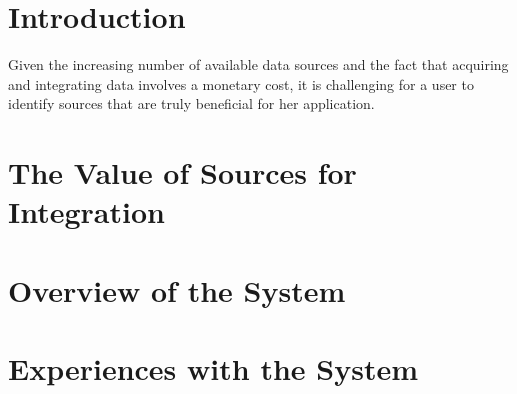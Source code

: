 \documentclass{vldb}
\begin{document}
\section{Introduction}
Given the increasing number of available data sources and the fact that acquiring and integrating data involves a monetary cost, it is challenging for a user to identify sources that are truly beneficial for her application.

\section{The Value of Sources for Integration}


\section{Overview of the System}


\section{Experiences with the System}



\end{document}
